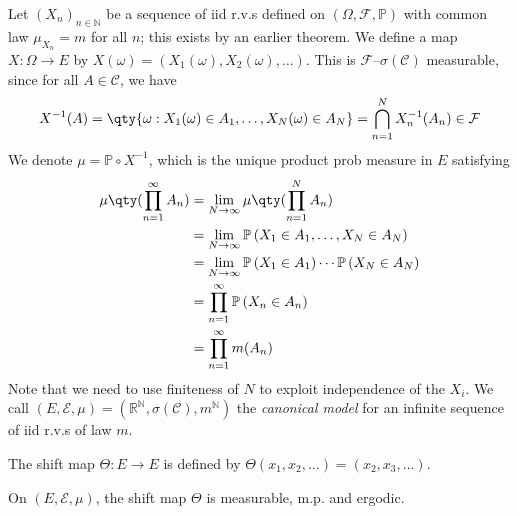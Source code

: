 Let $(X_n)_{n \in \mathbb N}$ be a sequence of iid r.v.s defined on $(\Omega, \mathcal F, \mathbb P)$ with common law $\mu_{X_n} = m$ for all $n$; this exists by an earlier theorem.
We define a map $X \colon \Omega \to E$ by $X(\omega) = (X_1(\omega), X_2(\omega), \dots)$.
This is $\mathcal F$--$\sigma(\mathcal C)$ measurable, since for all $A \in \mathcal C$, we have
\begin{align*}
        X^{-1}(A) = \qty{\omega : X_1(\omega) \in A_1, \dots, X_N(\omega) \in A_N} = \bigcap_{n=1}^N X_n^{-1}(A_n) \in \mathcal F
    \end{align*}
We denote $\mu = \mathbb P \circ X^{-1}$, which is the unique product prob measure in $E$ satisfying
\begin{align*}
		\mu\qty(\prod_{n=1}^\infty A_n) &= \lim_{N \to \infty} \mu\qty(\prod_{n=1}^N A_n) \\
		&= \lim_{N \to \infty} \prob{X_1 \in A_1, \dots, X_N \in A_N} \\
		&= \lim_{N \to \infty} \prob{X_1 \in A_1} \cdots \prob{X_N \in A_N} \\
		&= \prod_{n=1}^\infty \prob{X_n \in A_n} \\
		&= \prod_{n=1}^\infty m(A_n)
\end{align*}
Note that we need to use finiteness of $N$ to exploit independence of the $X_i$.
We call $(E, \mathcal E, \mu) = (\mathbb R^{\mathbb N}, \sigma(\mathcal C), m^{\mathbb N})$ the \emph{canonical model} for an infinite sequence of iid r.v.s of law $m$.

\begin{definition}
	The shift map $\Theta \colon E \to E$ is defined by $\Theta(x_1, x_2, \dots) = (x_2, x_3, \dots)$.
\end{definition}

\begin{theorem}
	On $(E, \mathcal{E}, \mu)$, the shift map $\Theta$ is measurable, m.p. and ergodic.
\end{theorem}

